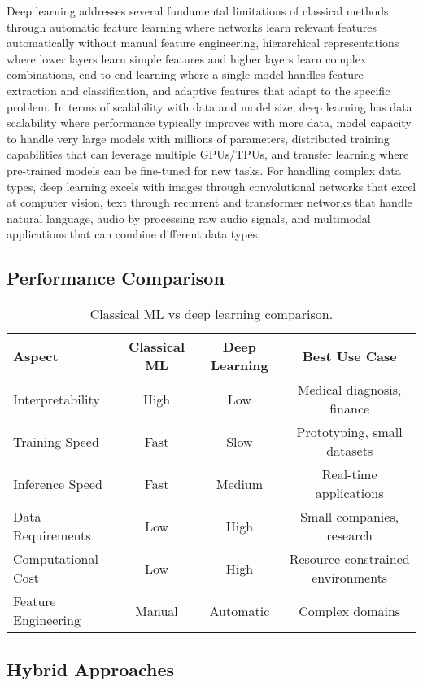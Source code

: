 Deep learning addresses several fundamental limitations of classical methods through automatic feature learning where networks learn relevant features automatically without manual feature engineering, hierarchical representations where lower layers learn simple features and higher layers learn complex combinations, end-to-end learning where a single model handles feature extraction and classification, and adaptive features that adapt to the specific problem. In terms of scalability with data and model size, deep learning has data scalability where performance typically improves with more data, model capacity to handle very large models with millions of parameters, distributed training capabilities that can leverage multiple GPUs/TPUs, and transfer learning where pre-trained models can be fine-tuned for new tasks. For handling complex data types, deep learning excels with images through convolutional networks that excel at computer vision, text through recurrent and transformer networks that handle natural language, audio by processing raw audio signals, and multimodal applications that can combine different data types.

\subsection{Performance Comparison}

\begin{table}[htbp]
\centering
\begin{tabular}{lccc}
\toprule
Aspect & Classical ML & Deep Learning & Best Use Case \\
\midrule
Interpretability & High & Low & Medical diagnosis, finance \\
Training Speed & Fast & Slow & Prototyping, small datasets \\
Inference Speed & Fast & Medium & Real-time applications \\
Data Requirements & Low & High & Small companies, research \\
Computational Cost & Low & High & Resource-constrained environments \\
Feature Engineering & Manual & Automatic & Complex domains \\
\bottomrule
\end{tabular}
\caption{Classical ML vs deep learning comparison.}
\label{tab:ml-vs-dl-comparison}
\end{table}

\subsection{Hybrid Approaches}

